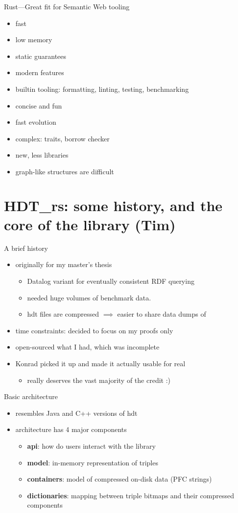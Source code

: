 \documentclass[14pt,aspectratio=169]{beamer}
\newcommand\pro{\item[$+$]}
\newcommand\con{\item[$-$]}
\begin{document}
\begin{frame}{Rust---Great fit for Semantic Web tooling}
\begin{itemize}
\pro fast
\pro low memory
\pro static guarantees
\pro modern features
\pro builtin tooling: formatting, linting, testing, benchmarking
\pro concise and fun
\pro fast evolution
\pause
\con complex: traits, borrow checker
\con new, less libraries
\con graph-like structures are difficult
\end{itemize}
\end{frame}

\section{HDT\_rs: some history, and the core of the library (Tim)}

\begin{frame}{A brief history}
    \begin{itemize}
        \item originally for my master's thesis
            \begin{itemize}
                \item Datalog variant for eventually consistent RDF querying
                \item needed huge volumes of benchmark data.
                \item hdt files are compressed $\implies$ easier to share data dumps of
            \end{itemize}
        \item time constraints: decided to focus on my proofs only
        \item open-sourced what I had, which was incomplete
        \item Konrad picked it up and made it actually usable for real
            \begin{itemize}
                \item really deserves the vast majority of the credit :)
            \end{itemize}
    \end{itemize}
\end{frame}

\begin{frame}{Basic architecture}
    \begin{itemize}
        \item resembles Java and C++ versions of hdt
        \item architecture has 4 major components
            \begin{itemize}
                \item \textbf{api}: how do users interact with the library
                \item \textbf{model}: in-memory representation of triples
                \item \textbf{containers}: model of compressed on-disk data (PFC strings)
                \item \textbf{dictionaries}: mapping between triple bitmaps and their compressed
                    components
            \end{itemize}
    \end{itemize}
\end{frame}
\end{document}

